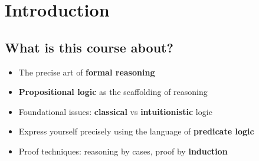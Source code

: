 \documentclass[12pt]{report}
\begin{document}

\begin{coqdoccode}
\coqdocemptyline
\end{coqdoccode}
\chapter{Introduction} \begin{coqdoccode}
\coqdocemptyline
\end{coqdoccode}
\section{What is this course about?}

\begin{coqdoccode}
\coqdocemptyline
\end{coqdoccode}

\begin{itemize}
\item  The precise art of \textbf{formal reasoning}

\end{itemize}



\begin{itemize}
\item  \textbf{Propositional logic} as the scaffolding of reasoning

\end{itemize}



\begin{itemize}
\item  Foundational issues: \textbf{ classical} vs \textbf{intuitionistic} logic

\end{itemize}



\begin{itemize}
\item  Express yourself precisely
    using the language of \textbf{predicate logic}

\end{itemize}



\begin{itemize}
\item  Proof techniques: reasoning by cases, proof by \textbf{induction}

\end{itemize}
\end{document}
